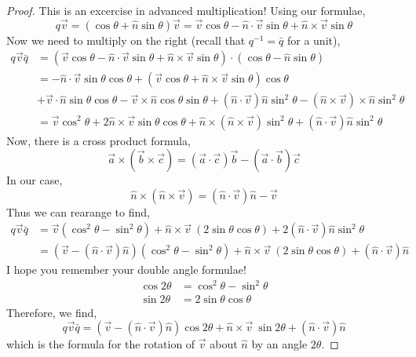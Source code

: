 \documentclass[12pt]{extarticle}
\theoremstyle{definition}
\begin{document}
\begin{proof}
This is an excercise in advanced multiplication! Using our formulae,
\[ q \vec{v} = (\cos{\theta} + \hat{n} \sin{\theta}) \vec{v} = \vec{v} \cos{\theta} - \hat{n} \cdot \vec{v} \sin{\theta} + \hat{n} \times \vec{v} \sin{\theta} \]
Now we need to multiply on the right (recall that $q^{-1} = \bar{q}$ for a unit),
\begin{align*}
q \vec{v} \bar{q} & = (\vec{v} \cos{\theta} - \hat{n} \cdot \vec{v} \sin{\theta} + \hat{n} \times \vec{v} \sin{\theta}) \cdot (\cos{\theta} - \hat{n} \sin{\theta})
\\
& = - \hat{n} \cdot \vec{v} \sin{\theta} \cos{\theta} + (\vec{v} \cos{\theta} + \hat{n} \times \vec{v} \sin{\theta}) \cos{\theta}
\\
& + \vec{v} \cdot \hat{n} \sin{\theta} \cos{\theta} - \vec{v} \times \hat{n} \cos{\theta} \sin{\theta} + (\hat{n} \cdot \vec{v}) \hat{n} \sin^2{\theta} - (\hat{n} \times \vec{v}) \times \hat{n} \sin^2{\theta} 
\\
& = \vec{v} \cos^{2}{\theta} + 2 \hat{n} \times \vec{v} \sin{\theta} \cos{\theta} + \hat{n} \times (\hat{n} \times \vec{v}) \sin^2{\theta} + (\hat{n} \cdot \vec{v}) \hat{n} \sin^2{\theta}
\end{align*}
Now, there is a cross product formula,
\[ \vec{a} \times (\vec{b} \times \vec{c}) = (\vec{a} \cdot \vec{c}) \vec{b} - (\vec{a} \cdot \vec{b}) \vec{c} \]
In our case,  
\[ \hat{n} \times (\hat{n} \times \vec{v}) = (\hat{n} \cdot \vec{v}) \hat{n} - \vec{v} \]  
Thus we can rearange to find,
\begin{align*}
q \vec{v} \bar{q} & = \vec{v} (\cos^2{\theta} - \sin^2{\theta}) + \hat{n} \times \vec{v} \: (2 \sin{\theta} \cos{\theta}) + 2 (\hat{n} \cdot \vec{v}) \hat{n} \sin^2{\theta} 
\\
& = (\vec{v} - (\hat{n} \cdot \vec{v}) \hat{n}) (\cos^2{\theta} - \sin^2{\theta}) + \hat{n} \times \vec{v} \: (2 \sin{\theta} \cos{\theta}) + (\hat{n} \cdot \vec{v}) \hat{n}
\end{align*}
I hope you remember your double angle formulae!
\begin{align*}
\cos{2 \theta} & = \cos^2{\theta} - \sin^2{\theta}
\\
\sin{2 \theta} & = 2 \sin{\theta} \cos{\theta}
\end{align*}
Therefore, we find,
\[ q \vec{v} \bar{q} = (\vec{v} - (\hat{n} \cdot \vec{v}) \hat{n}) \cos{2 \theta} + \hat{n} \times \vec{v} \: \sin{2 \theta} + (\hat{n} \cdot \vec{v}) \hat{n} \]
which is the formula for the rotation of $\vec{v}$ about $\hat{n}$ by an angle $2 \theta$. 
\end{proof}
\end{document}
